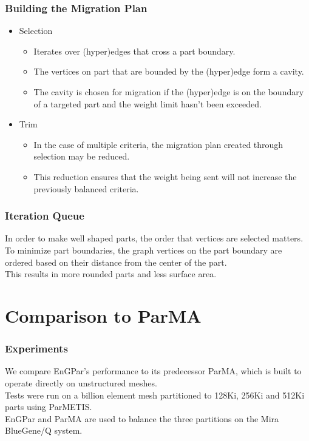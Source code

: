 \documentclass{beamer}
\begin{document}
\begin{frame}
  \frametitle{Building the Migration Plan}
  \begin{itemize}
  \item Selection
    \begin{itemize}
    \item Iterates over (hyper)edges that cross a part boundary.
    \item The vertices on part that are bounded by the (hyper)edge form a cavity.
    \item The cavity is chosen for migration if the (hyper)edge is on the boundary of a targeted part and the weight limit hasn't been exceeded.
    \end{itemize}
  \item Trim %
    \begin{itemize}
    \item In the case of multiple criteria, the migration plan created through selection may be reduced.
    \item This reduction ensures that the weight being sent will not increase the previously balanced criteria.
    \end{itemize}
  \end{itemize}
\end{frame}


\begin{frame}
  \frametitle{Iteration Queue}
  In order to make well shaped parts, the order that vertices are selected matters. \\
  \bigskip
  To minimize part boundaries, the graph vertices on the part boundary are ordered based on their distance from the center of the part. \\
  \bigskip
  This results in more rounded parts and less surface area. 
\end{frame}


\section{Comparison to ParMA}

\begin{frame}
  \frametitle{Experiments}
  We compare EnGPar's performance to its predecessor ParMA, which is built to operate directly on unstructured meshes.\\
  \medskip
  Tests were run on a billion element mesh partitioned to 128Ki, 256Ki and 512Ki parts using ParMETIS. \\
  \medskip
  EnGPar and ParMA are used to balance the three partitions on the Mira BlueGene/Q system.
\end{frame}
\end{document}
